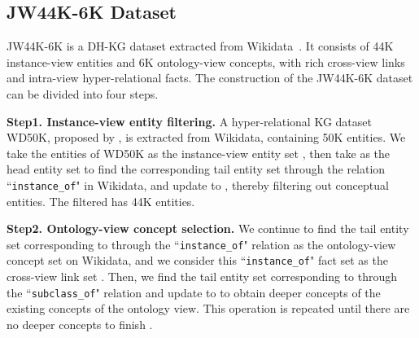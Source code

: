 \documentclass[letterpaper]{article} \usepackage{aaai23}  \usepackage{times}  \usepackage{helvet}  \usepackage{courier}  \usepackage[hyphens]{url}  \usepackage{graphicx} \urlstyle{rm} \def\UrlFont{\rm}  \usepackage{natbib}  \usepackage{caption} \frenchspacing  \setlength{\pdfpagewidth}{8.5in}  \setlength{\pdfpageheight}{11in}  \usepackage{times}
\begin{document}
\subsection{JW44K-6K Dataset}
JW44K-6K is a DH-KG dataset extracted from Wikidata~\citep{Wikidata}. It consists of 44K instance-view entities and 6K ontology-view concepts, with rich cross-view links and intra-view hyper-relational facts. The construction of the JW44K-6K dataset can be divided into four steps.

\textbf{Step1. Instance-view entity filtering.} 
A hyper-relational KG dataset WD50K, proposed by \citealp{StarE}, is extracted from Wikidata, containing 50K entities. We take the entities of WD50K as the instance-view entity set , then take  as the head entity set to find the corresponding tail entity set  through the relation ``\texttt{instance\_of}" in Wikidata, and update  to , thereby filtering out conceptual entities. The filtered  has 44K entities.

\textbf{Step2. Ontology-view concept selection.} 
We continue to find the tail entity set corresponding to  through the ``\texttt{instance\_of}" relation as the ontology-view concept set  on Wikidata, and we consider this ``\texttt{instance\_of}" fact set as the cross-view link set . Then, we find the tail entity set  corresponding to  through the ``\texttt{subclass\_of}" relation and update  to  to obtain deeper concepts of the existing concepts of the ontology view. This operation is repeated until there are no deeper concepts to finish . 


\begin{table}[t]
\small
\centering
{}
\caption{\label{T2}
Data Statistics for Dataset Partition of two DH-KG datasets, JW44K-6K and HTDM.
}
\end{table}
\end{document}
